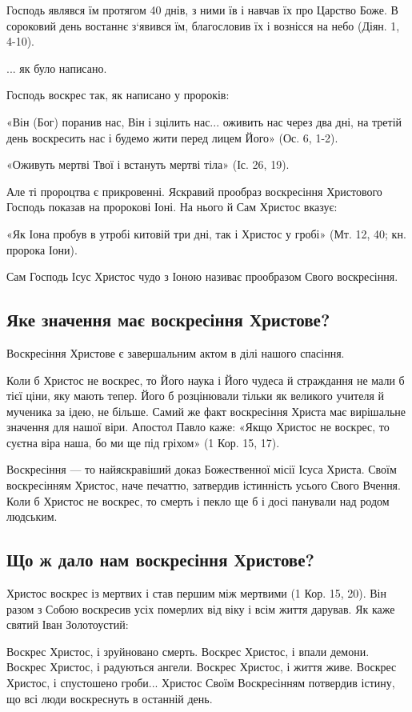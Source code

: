 \documentclass[main.tex]{subfiles}
\begin{document}
Господь являвся їм протягом 40 днів, з ними їв і навчав їх про Царство Боже. В сороковий день востаннє з`явився їм, благословив їх і вознісся на небо (Діян. 1, 4-10).

... як було написано.

Господь воскрес так, як написано у пророків:

«Він (Бог) поранив нас, Він і зцілить нас... оживить нас через два дні, на третій день воскресить нас і будемо жити перед лицем Його» (Ос. 6, 1-2).

«Оживуть мертві Твої і встануть мертві тіла» (Іс. 26, 19).

Але ті пророцтва є прикровенні. Яскравий прообраз воскресіння Христового Господь показав на пророкові Іоні. На нього й Сам Христос вказує:

«Як Іона пробув в утробі китовій три дні, так і Христос у гробі» (Мт. 12, 40; кн. пророка Іони).

Сам Господь Ісус Христос чудо з Іоною називає прообразом Свого воскресіння.

\subsection{Яке значення має воскресіння Христове?}

Воскресіння Христове є завершальним актом в ділі нашого спасіння.
 
Коли б Христос не воскрес, то Його наука і Його чудеса й страждання не мали б тієї ціни, яку мають тепер. Його б розцінювали тільки як великого учителя й мученика за ідею, не більше. Самий же факт воскресіння Христа має вирішальне значення для нашої віри. Апостол Павло каже:
«Якщо Христос не воскрес, то суєтна віра наша, бо ми ще під гріхом» (1 Кор. 15, 17).

Воскресіння — то найяскравіший доказ Божественної місії Ісуса Христа. Своїм воскресінням Христос, наче печаттю, затвердив істинність усього Свого Вчення. Коли б Христос не воскрес, то смерть і пекло ще б і досі панували над родом людським.

\subsection{Що ж дало нам воскресіння Христове?}

Христос воскрес із мертвих і став першим між мертвими (1 Кор. 15, 20). Він разом з Собою воскресив усіх померлих від віку і всім життя дарував.
Як каже святий Іван Золотоустий:

Воскрес Христос, і зруйновано смерть. Воскрес Христос, і впали демони. Воскрес Христос, і радуються ангели. Воскрес Христос, і життя живе. Воскрес Христос, і спустошено гроби... Христос Своїм Воскресінням потвердив істину, що всі люди воскреснуть в останній день.
\end{document}

